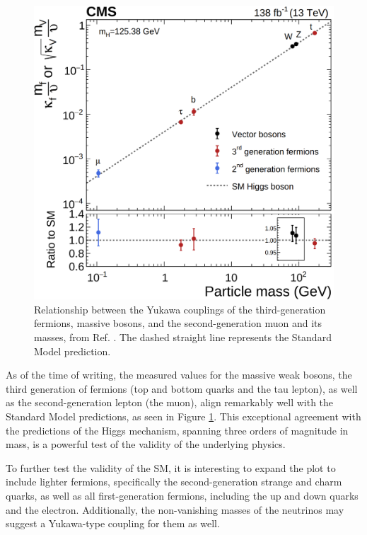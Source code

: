 \begin{figure}[!ht]
    \vspace*{-0.0cm}
    \centering
    \setlength{\mylength}{\textwidth}
    \includegraphics[width=0.60\mylength]{resources/Yukawa_couplings.png}
    \vspace*{-0.0cm}
    \caption{Relationship between the Yukawa couplings of the third-generation fermions, massive bosons, and the second-generation muon and its masses, from Ref. \cite{CMS:2022dwd}. The dashed straight line represents the Standard Model prediction.}
    \label{fig:Yukawa_couplings}
    \vspace*{-0.0cm}
\end{figure}

As of the time of writing, the measured values for the massive weak bosons, the third generation of fermions (top and bottom quarks and the tau lepton), as well as the second-generation lepton (the muon), align remarkably well with the Standard Model predictions, as seen in Figure \ref{fig:Yukawa_couplings}. This exceptional agreement with the predictions of the Higgs mechanism, spanning three orders of magnitude in mass, is a powerful test of the validity of the underlying physics.

To further test the validity of the SM, it is interesting to expand the plot to include lighter fermions, specifically the second-generation strange and charm quarks, as well as all first-generation fermions, including the up and down quarks and the electron. Additionally, the non-vanishing masses of the neutrinos may suggest a Yukawa-type coupling for them as well.

